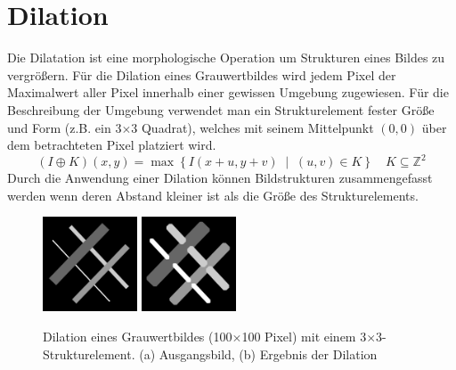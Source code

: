 \section{Dilation}
\writtenby{\dcauthornameewie}%
Die Dilatation ist eine morphologische Operation um Strukturen eines Bildes zu vergrößern.
Für die Dilation eines Grauwertbildes wird jedem Pixel der Maximalwert aller Pixel innerhalb einer gewissen Umgebung zugewiesen.
Für die Beschreibung der Umgebung verwendet man ein Strukturelement fester Größe und Form (z.B. ein 3$\times$3 Quadrat), welches mit seinem Mittelpunkt $(0,0)$ über dem betrachteten Pixel platziert wird.
  \[ (I\oplus K)(x,y)= \max \left\{ I(x+u,y+v) \;\middle|\; (u,v) \in K \right\} \quad K \subseteq \mathbb{Z}^2 \]
Durch die Anwendung einer Dilation können Bildstrukturen zusammengefasst werden wenn deren Abstand kleiner ist als die Größe des Strukturelements.

\begin{figure}[H]
  \label{fig:dilation}
  \centering
  \includegraphics[width=0.25\textwidth]{img/basics/dilation/before}
  \includegraphics[width=0.25\textwidth]{img/basics/dilation/after}
  \caption[Dilation]{Dilation eines Grauwertbildes (100$\times$100 Pixel) mit einem 3$\times$3-Strukturelement. (a) Ausgangsbild, (b) Ergebnis der Dilation}
\end{figure}
